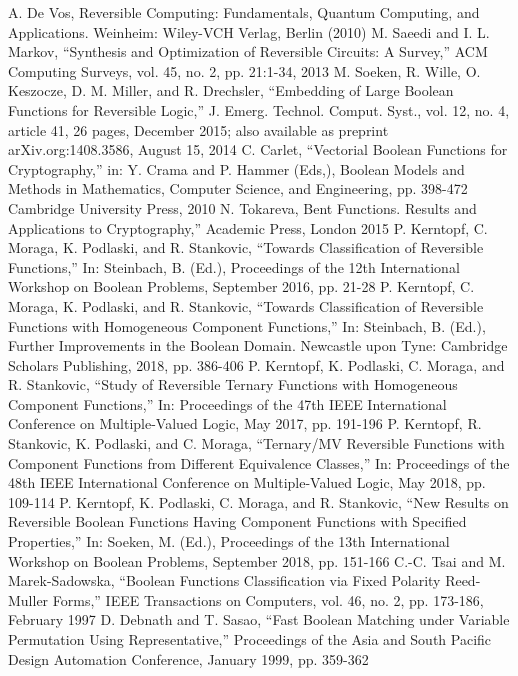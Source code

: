 \documentclass{wfiisul}
\begin{document}
	A. De Vos, Reversible Computing: Fundamentals, Quantum Computing, and Applications. Weinheim: Wiley-VCH Verlag, Berlin (2010)
	M. Saeedi and I. L. Markov, ``Synthesis and Optimization of Reversible Circuits: A Survey,'' ACM Computing Surveys, vol. 45, no. 2, pp. 21:1-34, 2013
	M. Soeken, R. Wille, O. Keszocze, D. M. Miller, and R. Drechsler, ``Embedding of Large Boolean Functions for Reversible Logic,'' J. Emerg. Technol. Comput. Syst., vol. 12, no. 4, article 41, 26 pages, December 2015; also available as preprint arXiv.org:1408.3586, August 15, 2014
	C. Carlet, ``Vectorial Boolean Functions for Cryptography,'' in: Y. Crama and P. Hammer (Eds,), Boolean Models and Methods in Mathematics, Computer Science, and Engineering, pp. 398-472 Cambridge University Press, 2010
	N. Tokareva, Bent Functions. Results and Applications to Cryptography,'' Academic Press, London 2015
	P. Kerntopf, C. Moraga, K. Podlaski, and R. Stankovic, ``Towards Classification of Reversible Functions,'' In: Steinbach, B. (Ed.), Proceedings of the 12th International Workshop on Boolean Problems, September 2016, pp. 21-28
	P. Kerntopf, C. Moraga, K. Podlaski, and R. Stankovic, ``Towards Classification of Reversible Functions with Homogeneous Component Functions,'' In: Steinbach, B. (Ed.), Further Improvements in the Boolean Domain. Newcastle upon Tyne: Cambridge Scholars Publishing, 2018, pp. 386-406
	P. Kerntopf, K. Podlaski, C. Moraga, and R. Stankovic, ``Study of Reversible Ternary Functions with Homogeneous Component Functions,'' In: Proceedings of the 47th IEEE International Conference on Multiple-Valued Logic, May 2017, pp. 191-196
	P. Kerntopf, R. Stankovic, K. Podlaski, and C. Moraga, ``Ternary/MV Reversible Functions with Component Functions from Different Equivalence Classes,'' In: Proceedings of the 48th IEEE International Conference on Multiple-Valued Logic, May 2018, pp. 109-114
	P. Kerntopf, K. Podlaski, C. Moraga, and R. Stankovic, ``New Results on Reversible Boolean Functions Having Component Functions with Specified Properties,'' In: Soeken, M. (Ed.), Proceedings of the 13th International Workshop on Boolean Problems, September 2018, pp. 151-166
	C.-C. Tsai and M. Marek-Sadowska, ``Boolean Functions Classification via Fixed Polarity Reed-Muller Forms,'' IEEE Transactions on Computers, vol. 46, no. 2, pp. 173-186, February 1997
	D. Debnath and T. Sasao, ``Fast Boolean Matching under Variable Permutation Using Representative,'' Proceedings of the Asia and South Pacific Design Automation Conference, January 1999, pp. 359-362
\end{document}
